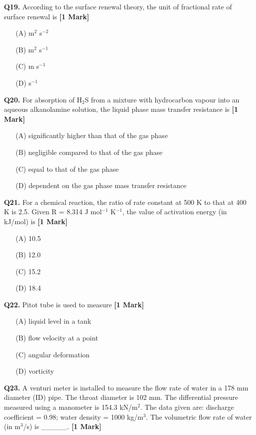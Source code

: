 \documentclass[11pt]{article}
\newcommand{\questiona}[2]{
    \noindent\textbf{Q#2.} #1 \hfill \textbf{[1 Mark]}
}
\begin{document}
\questiona{According to the surface renewal theory, the unit of fractional rate of surface renewal is}{19}
\begin{enumerate}
    \item[(A)] m\(^2\) s\(^{-2}\)  
    \item[(B)] m\(^2\) s\(^{-1}\)  
    \item[(C)] m s\(^{-1}\)  
    \item[(D)] s\(^{-1}\)  
\end{enumerate}

\questiona{For absorption of H\(_2\)S from a mixture with hydrocarbon vapour into an aqueous alkanolamine solution, the liquid phase mass transfer resistance is}{20}
\begin{enumerate}
    \item[(A)] significantly higher than that of the gas phase  
    \item[(B)] negligible compared to that of the gas phase  
    \item[(C)] equal to that of the gas phase  
    \item[(D)] dependent on the gas phase mass transfer resistance  
\end{enumerate}

\questiona{For a chemical reaction, the ratio of rate constant at 500 K to that at 400 K is 2.5. Given R = 8.314 J mol\(^{-1}\) K\(^{-1}\), the value of activation energy (in kJ/mol) is}{21}
\begin{enumerate}
    \item[(A)] 10.5  
    \item[(B)] 12.0  
    \item[(C)] 15.2  
    \item[(D)] 18.4  
\end{enumerate}

\questiona{Pitot tube is used to measure}{22}
\begin{enumerate}
    \item[(A)] liquid level in a tank  
    \item[(B)] flow velocity at a point  
    \item[(C)] angular deformation  
    \item[(D)] vorticity  
\end{enumerate}

\questiona{A venturi meter is installed to measure the flow rate of water in a 178 mm diameter (ID) pipe. The throat diameter is 102 mm. The differential pressure measured using a manometer is 154.3 kN/m\(^2\). The data given are: discharge coefficient = 0.98; water density = 1000 kg/m\(^3\). The volumetric flow rate of water (in m\(^3\)/s) is \_\_\_\_\_.}{23}
\end{document}
